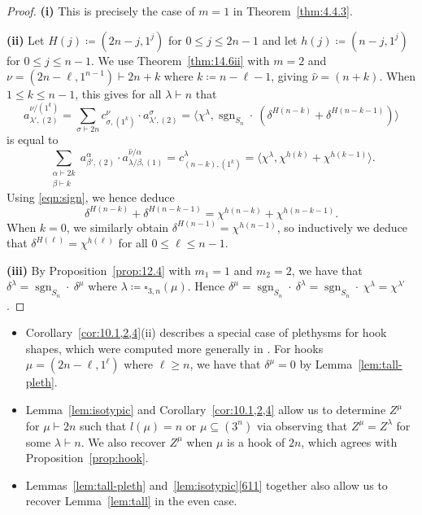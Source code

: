 \documentclass[ALCO, Unicode]{cedram}
\newcommand{\sgn}{\operatorname{sgn}}
\begin{document}
\begin{proof}
	\noindent\textbf{(i)} This is precisely the case of $m=1$ in Theorem~\ref{thm:4.4.3}.
	
	\noindent\textbf{(ii)} Let $H(j)\coloneqq (2n-j,1^j)$ for $0\le j\le 2n-1$ and let $h(j)\coloneqq (n-j,1^j)$ for $0\le j\le n-1$.
	We use Theorem~\ref{thm:14.6ii} with $m=2$ and $\nu=(2n-\ell,1^{n-1})\vdash 2n+k$ where $k\coloneqq n-\ell-1$, giving $\hat{\nu}=(n+k)$. When $1\le k\le n-1$, this gives for all $\lambda\vdash n$ that
	\[ a^{\nu/(1^k)}_{\lambda',(2)} = \sum_{\sigma\vdash 2n} c^\nu_{\sigma,(1^k)}\cdot a^\sigma_{\lambda',(2)} = \langle \chi^\lambda, \sgn_{S_n}\cdot\ (\delta^{H(n-k)}+\delta^{H(n-k-1)})\rangle \]
	is equal to
	\[ \sum_{\substack{\alpha\vdash 2k\\\beta\vdash k}} a^{\alpha}_{\beta',(2)}\cdot a^{\hat{\nu}/\alpha}_{\lambda/\beta,(1)} = c^\lambda_{(n-k),(1^k)} = \langle \chi^\lambda, \chi^{h(k)}+\chi^{h(k-1)}\rangle. \]
	Using \eqref{eqn:sign}, we hence deduce
	\[ \delta^{H(n-k)}+\delta^{H(n-k-1)}=\chi^{h(n-k)}+\chi^{h(n-k-1)}. \]
	When $k=0$, we similarly obtain $\delta^{H(n-1)}=\chi^{h(n-1)}$, so inductively we deduce that $\delta^{H(\ell)}=\chi^{h(\ell)}$ for all $0\le \ell\le n-1$.
	
	\noindent\textbf{(iii)} By Proposition~\ref{prop:12.4} with $m_1=1$ and $m_2=2$, we have that $\delta^{\lambda}=\sgn_{S_n}\cdot\ \delta^\mu$ where $\lambda\coloneqq \square_{3,n}(\mu)$. Hence $\delta^\mu=\sgn_{S_n}\cdot\ \delta^\lambda= \sgn_{S_n}\cdot\ \chi^\lambda=\chi^{\lambda'}$.
\end{proof}

\begin{remark}\label{rem:10}
	\begin{itemize}
		\item Corollary~\ref{cor:10.1,2,4}(ii) describes a special case of plethysms for hook shapes, which were computed more generally in \cite{LR}. For hooks $\mu=(2n-\ell,1^\ell)$ where $\ell\ge n$, we have that $\delta^\mu=0$ by Lemma~\ref{lem:tall-pleth}.
		\item Lemma~\ref{lem:isotypic} and Corollary~\ref{cor:10.1,2,4} allow us to determine $Z^\mu$ for $\mu\vdash 2n$ such that $l(\mu)=n$ or $\mu\subseteq(3^n)$ via observing that $Z^\mu=Z^\lambda$ for some $\lambda\vdash n$. We also recover $Z^\mu$ when $\mu$ is a hook of $2n$, which agrees with Proposition~\ref{prop:hook}.
		\item Lemmas~\ref{lem:tall-pleth} and~\ref{lem:isotypic}\ref{611} together also allow us to recover Lemma~\ref{lem:tall} in the even case. %
	\end{itemize}
\end{remark}
\end{document}
